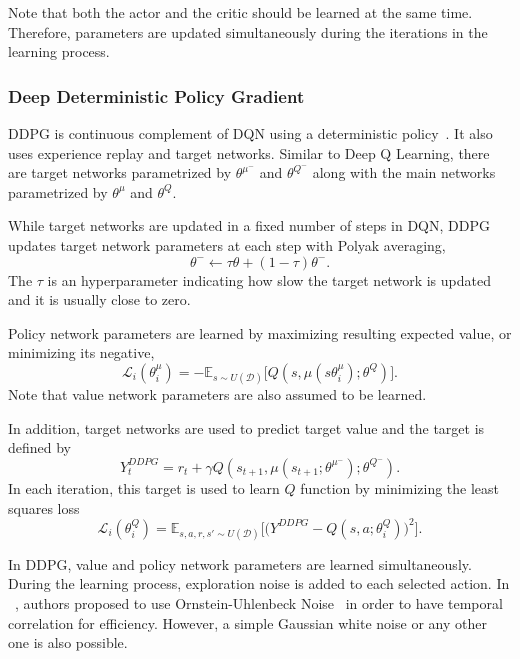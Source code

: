 Note that both the actor and the critic should be learned at the same time. Therefore, parameters are updated simultaneously during the iterations in the learning process. 

\subsubsection{Deep Deterministic Policy Gradient}
DDPG is continuous complement of DQN using a deterministic policy~\cite{lillicrap_continuous_2019}. 
It also uses experience replay and target networks. 
Similar to Deep Q Learning, there are target networks parametrized by $\theta^{\mu^-}$ and $\theta^{Q^-}$ 
along with the main networks parametrized by $\theta^{\mu}$ and $\theta^{Q}$. 

While target networks are updated in a fixed number of steps in DQN, 
DDPG updates target network parameters at each step with Polyak averaging, 
\begin{equation}
\label{eqn:target_update}
\theta^- \leftarrow \tau \theta + (1-\tau) \theta^- .
\end{equation}
The $\tau$ is an hyperparameter indicating how slow the target network is updated and it is usually close to zero. 

Policy network parameters are learned by maximizing resulting expected value, or minimizing its negative,
\begin{equation}
\label{eqn:ddpg_policy_loss}
\mathcal{L}_i(\theta^\mu_i) = -\mathbb{E}_{s \sim U(\mathcal{D})} \Big[ Q(s, \mu(s\theta^\mu_i);\theta^Q) \Big].
\end{equation} 
Note that value network parameters are also assumed to be learned. 

In addition, target networks are used to predict target value and the target is defined by
\begin{equation}
\label{eqn:ddpg_target}
Y_t^{DDPG} = r_t + \gamma Q(s_{t+1}, \mu(s_{t+1};\theta^{\mu^-});\theta^{Q^-}).
\end{equation}
In each iteration, this target is used to learn $Q$ function by minimizing the least squares loss 
\begin{equation}
\label{eqn:ddpg_loss}
\mathcal{L}_i(\theta^Q_i) = \mathbb{E}_{s,a,r,s'\sim U(\mathcal{D})}\Big[\big( Y^{DDPG} - Q(s,a;\theta^Q_i) \big) ^ 2 \Big].
\end{equation}

In DDPG, value and policy network parameters are learned simultaneously. 
During the learning process, exploration noise is added to each selected action. 
In ~\cite{lillicrap_continuous_2019}, authors proposed to use Ornstein-Uhlenbeck Noise~\cite{uhlenbeck_theory_1930} in order to have temporal correlation for efficiency. 
However, a simple Gaussian white noise or any other one is also possible. 

